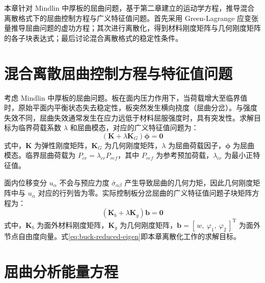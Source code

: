 
本章针对 Mindlin 中厚板的屈曲问题，基于第二章建立的运动学方程，推导混合离散格式下的屈曲控制方程与广义特征值问题。首先采用 Green-Lagrange 应变张量推导屈曲问题的虚功方程；其次进行离散化，得到材料刚度矩阵与几何刚度矩阵的各子块表达式；最后讨论混合离散格式的稳定性条件。

\section{混合离散屈曲控制方程与特征值问题}

考虑 Mindlin 中厚板的屈曲问题。板在面内压力作用下，当荷载增大至临界值时，原始平面内平衡状态失去稳定性，板突然发生横向挠度（屈曲分岔）。与强度失效不同，屈曲失效通常发生在应力远低于材料屈服强度时，具有突发性。求解目标为临界荷载系数 $\lambda$ 和屈曲模态，对应的广义特征值问题为：
\begin{equation}
(\mathbf{K} + \lambda \mathbf{K}_G)\boldsymbol{\phi} = \mathbf{0}
\label{eq:buck-eigen}
\end{equation}
式中，$\mathbf{K}$ 为弹性刚度矩阵，$\mathbf{K}_G$ 为几何刚度矩阵，$\lambda$ 为屈曲荷载因子，$\boldsymbol{\phi}$ 为屈曲模态。临界屈曲荷载为 $P_{cr} = \lambda_{cr} P_{ref}$，其中 $P_{ref}$ 为参考预加荷载，$\lambda_{cr}$ 为最小正特征值。

面内位移变分 $u_\alpha$ 不会与预应力度 $\bar{\sigma}_{\alpha\beta}$ 产生导致屈曲的几何力矩，因此几何刚度矩阵中与 $u_\alpha$ 对应的行列皆为零。实际控制板分岔屈曲的广义特征值问题子块矩阵方程为：
\begin{equation}
(\mathbf{K}_b + \lambda \mathbf{K}_g)\mathbf{b} = \mathbf{0}
\label{eq:buck-reduced-eigen}
\end{equation}
式中，$\mathbf{K}_b$ 为面外材料刚度矩阵，$\mathbf{K}_g$ 为几何刚度矩阵，$\mathbf{b} = [\,w,\ \varphi_1,\ \varphi_2\,]^{\mathrm{T}}$ 为面外节点自由度向量。式\eqref{eq:buck-reduced-eigen}即本章离散化工作的求解目标。

\section{屈曲分析能量方程}

